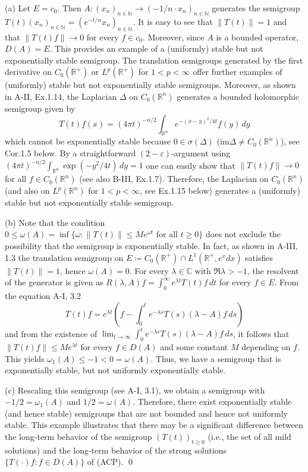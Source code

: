 \begin{example}\label{ex:a4-1.2}
(a) Let $E = c_{0}$. 
Then $A: (x_{n})_{n \in \mathbb{N}} \to (-1/n \cdot x_{n})_{n \in \mathbb{N}}$ generates the semigroup $T(t)(x_{n})_{n \in \mathbb{N}} = (e^{-t/n} x_{n})_{n \in \mathbb{N}}$.
It is easy to see that $\|T(t)\|=1$ and that $\|T(t)f\|\to 0$ for every $f \in c_{0}$.
Moreover, since $A$ is a bounded operator, $D(A) = E$.
This provides an example of a (uniformly) stable but not exponentially stable semigroup.
The translation semigroups generated by the first derivative on $C_0(\mathbb{R}^{+})$ or $L^{p}(\mathbb{R}^{+})$ for $1 < p < \infty$ offer further examples of (uniformly) stable but not exponentially stable semigroups.
Moreover, as shown in A-II, Ex.1.14, the Laplacian $\Delta$ on $C_0(\mathbb{R}^{n})$ generates a bounded holomorphic semigroup given by
\[
T(t)f(x) = (4\pi t)^{-n/2} \int_{\mathbb{R}^{n}} e^{-(x-y)^{2}/4t} f(y) \, dy
\]
which cannot be exponentially stable because $0 \in \sigma(\Delta)$ ($\text{im}\Delta \not= C_0(\mathbb{R}^{n})$), see Cor.1.5 below.
By a straightforward $(2-\varepsilon)$-argument using $(4\pi t)^{-n/2}\int_{\mathbb{R}^{n}} \exp(-y^{2}/4t) \, dy = 1$ one can easily show that $\|T(t)f\| \to 0$ for all $f \in C_0(\mathbb{R}^{n})$ (see also B-III, Ex.1.7).
\noindent
Therefore, the Laplacian on $C_0(\mathbb{R}^{n})$ (and also on $L^{p}(\mathbb{R}^{n})$ for $1 < p < \infty$, see Ex.1.15 below) generates a (uniformly) stable but not exponentially stable semigroup.

\bigskip
\noindent
(b) Note that the condition $0 \leq \omega(A) = \inf\{\omega : \|T(t)\| \leq Me^{\omega t} \text{ for all } t \geq 0\}$ does not exclude the possibility that the semigroup is exponentially stable.
In fact, as shown in A-III, 1.3 the translation semigroup on $E \coloneqq C_0(\mathbb{R}^{+}) \cap L^{1}(\mathbb{R}^{+},e^{x}dx)$ satisfies $\|T(t)\| = 1$, hence $\omega(A) = 0$. 
For every $\lambda \in \mathbb{C}$ with $\Re \lambda > -1$, the resolvent of the generator is given as $R(\lambda,A)f = \int_{0}^{\infty} e^{\lambda t} T(t)f \, dt$ for every $f \in E$.
From the equation A-I, 3.2
\[
T(t)f = e^{\lambda t}\left(f - \int_{0}^{t} e^{-\lambda s} T(s) (\lambda - A)f \, ds\right)
\]
and from the existence of $\lim_{t \to \infty} \int_{0}^{t} e^{-\lambda s} T(s) (\lambda - A)f \, ds$, it follows that 
$\|T(t)f\| \leq Me^{\lambda t}$ for every $f \in D(A)$ and some constant $M$ depending on $f$. This yields $\omega_{1}(A) \le -1 < 0 = \omega(A)$. 
Thus, we have a semigroup that is exponentially stable, but not uniformly exponentially stable.

\bigskip
\noindent
(c) Rescaling this semigroup (see A-I, 3.1), we obtain a semigroup with $-1/2 = \omega_{1}(A)$ and $1/2 = \omega(A)$.
Therefore, there exist exponentially stable (and hence stable) semigroups that are not bounded and hence not uniformly stable.
This example illustrates that there may be a significant difference between the long-term behavior of the semigroup $(T(t))_{t \geq 0}$ (i.e., the set of all mild solutions) and the long-term behavior of the strong solutions $\{T(\cdot)f : f \in D(A)\}$ of (ACP). 
\qed
\end{example}


